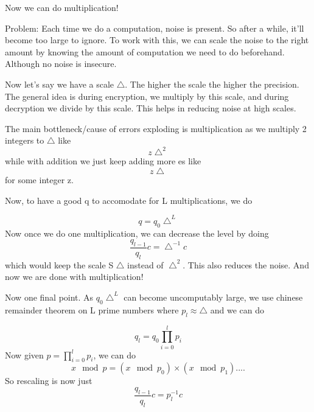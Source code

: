 \documentclass{article}
\begin{document}
	Now we can do multiplication!
	
	Problem: Each time we do a computation, noise is present. So after a while, it'll become too large to ignore. To work with this, we can scale the noise to the right amount by knowing the amount of computation we need to do beforehand. Although no noise is insecure.
	
	Now let's say we have a scale $\bigtriangleup$. The higher the scale the higher the precision. The general idea is during encryption, we multiply by this scale, and during decryption we divide by this scale. This helps in reducing noise at high scales.
	
	The main bottleneck/cause of errors exploding is multiplication as we multiply 2 integers to $\bigtriangleup$ like
	\begin{equation}
		z\bigtriangleup^2
	\end{equation}
	while with addition we just keep adding more es like
	\begin{equation}
		z\bigtriangleup
	\end{equation}
	for some integer z.
	
	Now, to have a good q to accomodate for L multiplications, we do
	
	\begin{equation}
		q = q_0 \bigtriangleup^L
	\end{equation}
	Now once we do one multiplication, we can decrease the level by doing
	\begin{equation}
		\dfrac{q_{l-1}}{q_l}c = \bigtriangleup^{-1}c
	\end{equation}
	which would keep the scale S $\bigtriangleup$ instead of $\bigtriangleup^2$. This also reduces the noise. And now we are done with multiplication!
	
	Now one final point. As $q_0 \bigtriangleup^L$ can become uncomputably large, we use chinese remainder theorem on L prime numbers where $p_l \approx \bigtriangleup$ and we can do
	
	\begin{equation}
		q_l = q_0 \prod^{l}_{i=0}p_i
	\end{equation}
	Now given $p=\prod^{l}_{i=0}p_i$, we can do
	\begin{equation}
		x \mod p =(x \mod p_0)\times(x \mod p_1)....
	\end{equation}
	So rescaling is now just
	\begin{equation}
		\dfrac{q_{l-1}}{q_l}c = p_l^{-1}c
	\end{equation}
	
\end{document}
